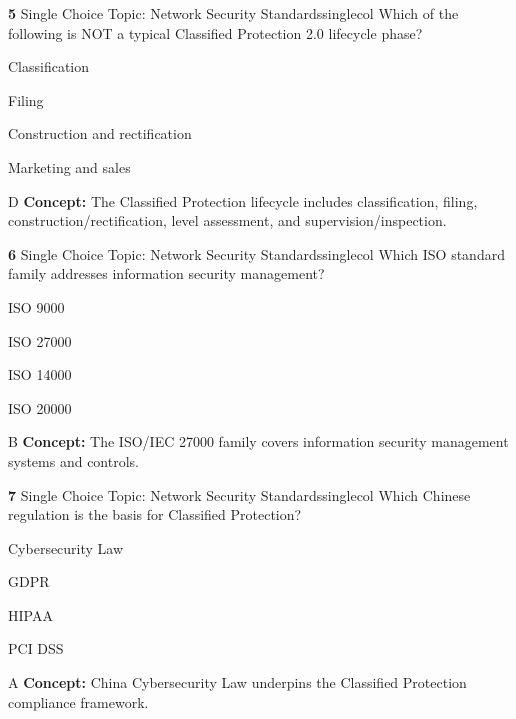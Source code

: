 \documentclass[10pt,a4paper]{article}
\begin{document}
\begin{qcard}{\color{white}\textbf{5} \hfill \small Single Choice \textbar{} Topic: Network Security Standards}{singlecol}
Which of the following is NOT a typical Classified Protection 2.0 lifecycle phase?

\begin{qoptions}
\item Classification
\item Filing
\item Construction and rectification
\item Marketing and sales
\end{qoptions}
\begin{explainbox}{D}
\textbf{Concept:} The Classified Protection lifecycle includes classification, filing, construction/rectification, level assessment, and supervision/inspection.
\end{explainbox}
\end{qcard}

\begin{qcard}{\color{white}\textbf{6} \hfill \small Single Choice \textbar{} Topic: Network Security Standards}{singlecol}
Which ISO standard family addresses information security management?

\begin{qoptions}
\item ISO 9000
\item ISO 27000
\item ISO 14000
\item ISO 20000
\end{qoptions}
\begin{explainbox}{B}
\textbf{Concept:} The ISO/IEC 27000 family covers information security management systems and controls.
\end{explainbox}
\end{qcard}

\begin{qcard}{\color{white}\textbf{7} \hfill \small Single Choice \textbar{} Topic: Network Security Standards}{singlecol}
Which Chinese regulation is the basis for Classified Protection?

\begin{qoptions}
\item Cybersecurity Law
\item GDPR
\item HIPAA
\item PCI DSS
\end{qoptions}
\begin{explainbox}{A}
\textbf{Concept:} China Cybersecurity Law underpins the Classified Protection compliance framework.
\end{explainbox}
\end{qcard}
\end{document}

